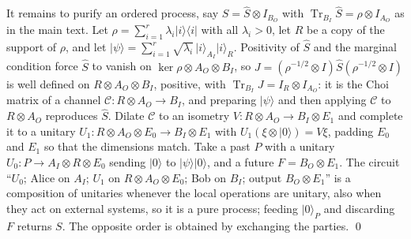 \documentclass[aps,prl,reprint,superscriptaddress,nofootinbib,longbibliography,raggedbottom]{revtex4-2}
\DeclareMathOperator{\Tr}{Tr}
\newcommand{\ket}[1]{\lvert #1\rangle}
\newcommand{\bra}[1]{\langle #1\rvert}
\newcommand{\proj}[1]{\ket{#1}\!\bra{#1}}
\begin{document}
It remains to purify an ordered process, say $S=\widehat S\otimes I_{B_O}$
with $\Tr_{B_I}\widehat S=\rho\otimes I_{A_O}$ as in the main text. Let
$\rho=\sum_{i=1}^r\lambda_i\proj i$ with all $\lambda_i>0$, let $R$ be a
copy of the support\vadjust{\vskip1.5pt} of $\rho$, and let
$\ket\psi=\sum_{i=1}^r\sqrt{\lambda_i}\,\ket i_{A_I}\ket i_R$. Positivity
of $\widehat S$ and the marginal condition force $\widehat S$ to vanish on
$\ker\rho\otimes A_O\otimes B_I$, so
$J=(\rho^{-1/2}\otimes I)\widehat S(\rho^{-1/2}\otimes I)$ is well defined
on $R\otimes A_O\otimes B_I$, positive, with
$\Tr_{B_I}J=I_R\otimes I_{A_O}$: it is the Choi matrix of a channel
$\mathcal C\colon R\otimes A_O\to B_I$, and preparing $\ket\psi$ and then
applying $\mathcal C$ to $R\otimes A_O$ reproduces $\widehat S$. Dilate
$\mathcal C$ to an isometry $V\colon R\otimes A_O\to B_I\otimes E_1$ and
complete it to a unitary $U_1\colon R\otimes A_O\otimes E_0\to
B_I\otimes E_1$ with $U_1(\xi\otimes\ket0)=V\xi$, padding $E_0$ and $E_1$
so that the dimensions match. Take a past $P$ with a unitary
$U_0\colon P\to A_I\otimes R\otimes E_0$ sending $\ket0$ to
$\ket\psi\ket0$, and a future $F=B_O\otimes E_1$. The circuit ``$U_0$;
Alice on $A_I$; $U_1$ on $R\otimes A_O\otimes E_0$; Bob on $B_I$; output
$B_O\otimes E_1$'' is a composition of unitaries whenever the local
operations are unitary, also when they act on external systems, so it is a
pure process; feeding $\ket0_P$ and discarding $F$ returns $S$. The
opposite order is obtained by exchanging the parties. \qed
\end{document}
